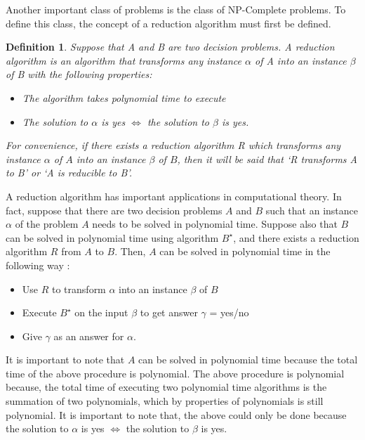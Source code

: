 \documentclass[12pt]{article}
\newtheorem{definition}{Definition}[subsection]
\numberwithin{equation}{subsection}
\numberwithin{table}{subsection}
\numberwithin{algorithm}{subsection}
\numberwithin{figure}{subsection}
\begin{document}
Another important class of problems is the class of NP-Complete problems. To define this class, the concept of a reduction algorithm must first be defined.
\begin{definition}
\label{reduction_algorithm}
Suppose that A and B are two decision problems. A reduction algorithm is an algorithm that transforms any instance $\alpha$ of A into an instance $\beta$ of B with the following properties:
\begin{itemize}
   \item The algorithm takes polynomial time to execute
   \item The solution to $\alpha$ is yes $\iff$ the solution to $\beta$ is yes.
\end{itemize} 
For convenience, if there exists a reduction algorithm R which transforms any instance $\alpha$ of $A$ into an instance $\beta$ of $B$, then it will be said that `R transforms A to B' or `A is reducible to B'. {}
\end{definition}
A reduction algorithm has important applications in computational theory. In fact, suppose that there are two decision problems $\mathit{A}$ and $\mathit{B}$ such that an instance $\mathit{\alpha}$ of the problem $\mathit{A}$ needs to be solved in polynomial time. Suppose also that $\mathit{B}$ can be solved in polynomial time using algorithm $\mathit{B^\star}$, and there exists a reduction algorithm $\mathit{R}$ from $\mathit{A}$ to $\mathit{B}$. Then, $\mathit{A}$ can be solved in polynomial time in the following way :
 \begin{itemize}
	\item Use $\mathit{R}$ to transform $\mathit{\alpha}$ into an instance $\mathit{\beta}$ of $\mathit{B}$
	\item Execute $\mathit{B^\star}$ on the input $\beta$ to get answer $\gamma$ = yes/no
	\item Give $\mathit{\gamma}$ as an answer for $\mathit{\alpha}$.
\end{itemize} 
It is important to note that $\mathit{A}$ can be solved in polynomial time because the total time of the above procedure is polynomial. The above procedure is polynomial because, the total time of executing two polynomial time algorithms is the summation of two polynomials, which by properties of polynomials is still polynomial. It is important to note that, the above could only be done because the solution to $\alpha$ is yes $\iff$ the solution to $\beta$ is yes. \cite{cormen_leiserson_rivest_stein}\\\\
\end{document}
